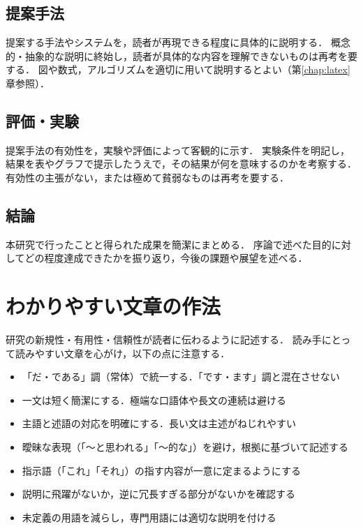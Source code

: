 \subsection{提案手法}
提案する手法やシステムを，読者が再現できる程度に具体的に説明する．
概念的・抽象的な説明に終始し，読者が具体的な内容を理解できないものは再考を要する．
図や数式，アルゴリズムを適切に用いて説明するとよい（第\ref{chap:latex}章参照）．

\subsection{評価・実験}
提案手法の有効性を，実験や評価によって客観的に示す．
実験条件を明記し，結果を表やグラフで提示したうえで，その結果が何を意味するのかを考察する．
有効性の主張がない，または極めて貧弱なものは再考を要する．

\subsection{結論}
本研究で行ったことと得られた成果を簡潔にまとめる．
序論で述べた目的に対してどの程度達成できたかを振り返り，今後の課題や展望を述べる．

\section{わかりやすい文章の作法}
\label{sec:writing-style}
研究の新規性・有用性・信頼性が読者に伝わるように記述する\cite{kisaragi}．
読み手にとって読みやすい文章を心がけ，以下の点に注意する．

\begin{itemize}
    \item 「だ・である」調（常体）で統一する．「です・ます」調と混在させない
    \item 一文は短く簡潔にする．極端な口語体や長文の連続は避ける
    \item 主語と述語の対応を明確にする．長い文は主述がねじれやすい
    \item 曖昧な表現（「〜と思われる」「〜的な」）を避け，根拠に基づいて記述する
    \item 指示語（「これ」「それ」）の指す内容が一意に定まるようにする
    \item 説明に飛躍がないか，逆に冗長すぎる部分がないかを確認する
    \item 未定義の用語を減らし，専門用語には適切な説明を付ける
\end{itemize}

